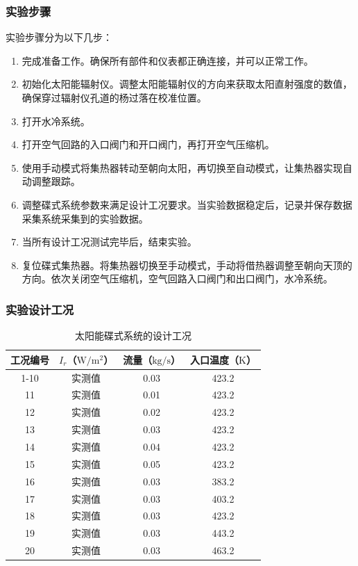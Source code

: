 \subsubsection{实验步骤}
实验步骤分为以下几步：
\begin{enumerate}[label=(\arabic*)]
	\item 完成准备工作。确保所有部件和仪表都正确连接，并可以正常工作。
	\item 初始化太阳能辐射仪。调整太阳能辐射仪的方向来获取太阳直射强度的数值，确保穿过辐射仪孔道的杨过落在校准位置。
	\item 打开水冷系统。
	\item 打开空气回路的入口阀门和开口阀门，再打开空气压缩机。
	\item 使用手动模式将集热器转动至朝向太阳，再切换至自动模式，让集热器实现自动调整跟踪。
	\item 调整碟式系统参数来满足设计工况要求。当实验数据稳定后，记录并保存数据采集系统采集到的实验数据。
	\item 当所有设计工况测试完毕后，结束实验。 
	\item 复位碟式集热器。将集热器切换至手动模式，手动将借热器调整至朝向天顶的方向。依次关闭空气压缩机，空气回路入口阀门和出口阀门，水冷系统。
\end{enumerate}

\subsubsection{实验设计工况}

\begin{table}[htbp]\footnotesize
\setlength{\abovecaptionskip}{-10pt}
	\caption{太阳能碟式系统的设计工况}
	\begin{center}
	\begin{tabular}{cccc}
		\toprule
		工况编号	& $I_r$（$\mathrm{W/m^2}$）	&	流量（$\mathrm{kg/s}$）			&	入口温度（$\mathrm{K}$）\\
		\midrule
		1-10	&	实测值	&	0.03	&	423.2\\
		11	&	实测值	&	0.01	&	423.2\\
		12	&	实测值	&	0.02	&	423.2\\
		13	&	实测值	&	0.03	&	423.2\\
		14	&	实测值	&	0.04	&	423.2\\
		15	&	实测值	&	0.05	&	423.2\\
		16	&	实测值	&	0.03	&	383.2\\
		17	&	实测值	&	0.03	&	403.2\\
		18	&	实测值	&	0.03	&	423.2\\
		19	&	实测值	&	0.03	&	443.2\\
		20	&	实测值	&	0.03	&	463.2\\
		\bottomrule
	\end{tabular}
	\end{center}
	\label{tab:DesignedCasesForDish}
\end{table}

